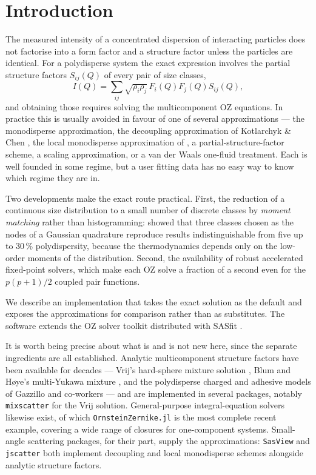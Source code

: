 \documentclass[11pt,a4paper]{article}
\newcommand{\code}[1]{\texttt{#1}}
\newcommand{\Q}{Q}
\begin{document}
\section{Introduction}

The measured intensity of a concentrated dispersion of interacting particles
does not factorise into a form factor and a structure factor unless the
particles are identical. For a polydisperse system the exact expression
involves the partial structure factors $S_{ij}(\Q)$ of every pair of size
classes,
\begin{equation}
I(\Q) = \sum_{ij} \sqrt{\rho_i\rho_j}\, F_i(\Q) F_j(\Q) S_{ij}(\Q),
\label{eq:iexact}
\end{equation}
and obtaining those requires solving the multicomponent OZ equations. In
practice this is usually avoided in favour of one of several approximations
--- the monodisperse approximation, the decoupling approximation of Kotlarchyk
\& Chen \citep{KotlarchykChen1983}, the local monodisperse approximation of \citet{Pedersen1994}, a
partial-structure-factor scheme, a scaling approximation, or a van der Waals
one-fluid treatment. Each is well founded in some regime, but a user fitting
data has no easy way to know which regime they are in.

Two developments make the exact route practical. First, the reduction of a
continuous size distribution to a small number of discrete classes by
\emph{moment matching} rather than histogramming:
\citet{DAguannoKlein1991,DAguannoKlein1992} showed that three classes chosen
as the nodes of a Gaussian quadrature
reproduce results indistinguishable from five up to 30\,\% polydispersity,
because the thermodynamics depends only on the low-order moments of the
distribution. Second, the availability of robust accelerated fixed-point
solvers, which make each OZ solve a fraction of a second even for the
$p(p+1)/2$ coupled pair functions.

We describe an implementation that takes the exact solution as the default and
exposes the approximations for comparison rather than as substitutes. The
software extends the OZ solver toolkit distributed with SASfit
\citep{Bressler2015,KohlbrecherBressler2022}.

It is worth being precise about what is and is not new here, since the
separate ingredients are all established. Analytic multicomponent structure
factors have been available for decades --- Vrij's hard-sphere mixture
solution \citep{Vrij1979}, Blum and H{\o}ye's multi-Yukawa mixture
\citep{BlumHoye1978}, and the polydisperse charged and adhesive models of
Gazzillo and co-workers \citep{Gazzillo1997,GazzilloGiacometti2000} --- and
are implemented in several packages, notably \code{mixscatter} for the Vrij
solution. General-purpose integral-equation solvers likewise exist, of which
\code{OrnsteinZernike.jl} \citep{PihlajamaaJanssen2024} is the most complete
recent example, covering a wide range of closures for one-component systems.
Small-angle scattering packages, for their part, supply the approximations:
\code{SasView} and \code{jscatter} both implement decoupling and local
monodisperse schemes alongside analytic structure factors.
\end{document}
